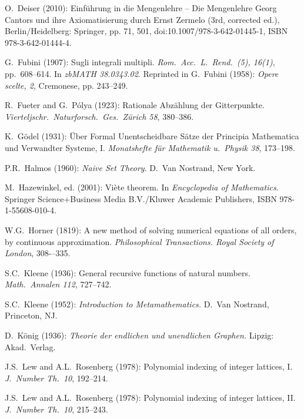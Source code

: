 \begin{thebibliography}{999}
O.~Deiser (2010): Einf\"{u}hrung in die Mengenlehre – Die Mengenlehre
Georg Cantors und ihre Axiomatisierung durch Ernst Zermelo (3rd,
corrected ed.), Berlin/Heidelberg: Springer, pp. 71, 501,
doi:10.1007/978-3-642-01445-1, ISBN 978-3-642-01444-4.




G.~Fubini (1907): Sugli integrali multipli.
{\it Rom.~Acc.~L.~Rend.~(5), 16(1)}, pp.~608–614.  In {\it zbMATH
  38.0343.02}.  Reprinted in
G.~Fubini (1958): {\it Opere scelte, 2}, Cremonese, pp. 243–249.

R.~Fueter and G.~P\'{o}lya (1923):
Rationale Abz\"{a}hlung der Gitterpunkte.  {\it
Vierteljschr.~Naturforsch.~Ges.~Z\"{u}rich 58}, 380--386.


K.~G\"{o}del (1931): \"{U}ber Formal Unentscheidbare S\"{a}tze der
Principia Mathematica und Verwandter Systeme, I.  {\it Monatshefte
f\"{u}r Mathematik u.~Physik 38}, 173--198.



P.R.~Halmos (1960):
{\it Naive Set Theory}.
D.~Van Nostrand, New York.

M.~Hazewinkel, ed. (2001): %
Vi\`{e}te theorem.  In {\it Encyclopedia of Mathematics}.
Springer Science+Business Media B.V./Kluwer Academic Publishers,
ISBN 978-1-55608-010-4.

W.G.~Horner (1819): 
A new method of solving numerical equations of all orders, by
continuous approximation. {\it Philosophical Transactions. Royal
Society of London}, 308-–335.






S.C.~Kleene (1936): General recursive functions of natural numbers.
{\it Math.~Annalen 112}, 727--742.

S.C.~Kleene (1952):
{\it Introduction to Metamathematics.}
D.~Van Nostrand, Princeton, NJ.

D.~K\"onig (1936):
{\it Theorie der endlichen und unendlichen Graphen.}  Lipzig: Akad.~Verlag.



J.S.~Lew and A.L.~Rosenberg (1978): Polynomial indexing of integer
lattices, I.  {\it J.~Number Th.~10}, 192--214.
 
J.S.~Lew and A.L.~Rosenberg (1978): Polynomial indexing of integer
lattices, II.  {\it J.~Number Th.~10}, 215--243.


\end{thebibliography}
